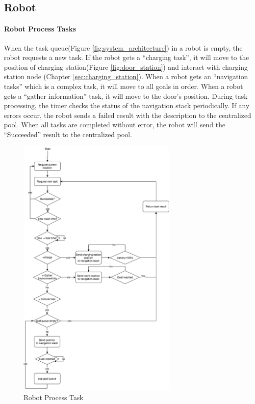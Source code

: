 \subsection{Robot}

\paragraph{Robot Process Tasks}
When the task queue(Figure \ref{fig:system_architecture}) in a robot is empty, the robot requests a new task. If the robot gets a ``charging task'', it will move to the position of charging station(Figure \ref{fig:door_station}) and interact with charging station node (Chapter \ref{sec:charging_station}).
When a robot gets an ``navigation tasks'' which is a complex task, it will move to all goals in order.
When a robot gets a ``gather information'' task, it will move to the door's position.
During task processing, the timer checks the status of the navigation stack periodically. If any errors occur, the robot sends a failed result with the description to the centralized pool. 
When all tasks are completed without error, the robot will send the ``Succeeded'' result to the centralized pool.


\begin{figure}
 \centering
 \includegraphics[width = 0.7\textwidth]{content/images/ch4/robot_process_task.drawio.png}
 \caption{Robot Process Task }
 \label{fig:task_process_robot}
\end{figure}


